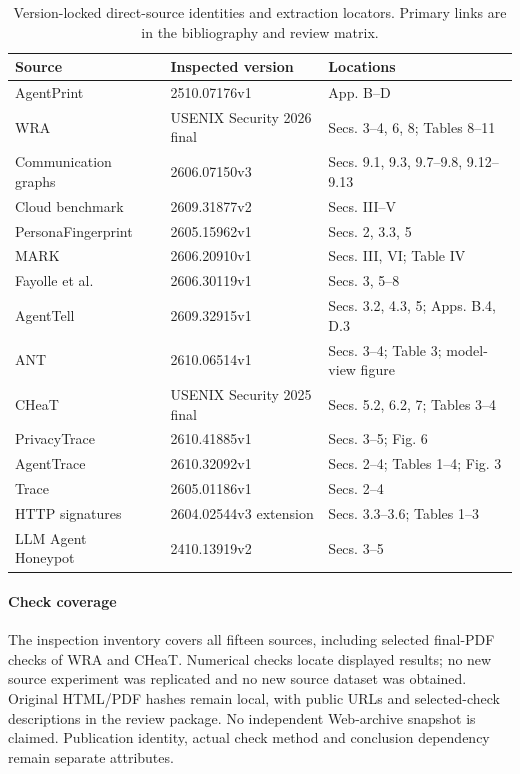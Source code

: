 \begin{table}[t]\centering\small
\caption{Version-locked direct-source identities and extraction locators. Primary links are in the bibliography and review matrix.}\label{tab:versions}
\begin{tabularx}{\textwidth}{@{}P{.29\textwidth}P{.32\textwidth}Y@{}}\toprule
Source & Inspected version & Locations \\\midrule
AgentPrint~\cite{agentprint2025} & 2510.07176v1 & App. B--D \\
WRA~\cite{jeong2026wra} & USENIX Security 2026 final & Secs. 3--4, 6, 8; Tables 8--11 \\
Communication graphs~\cite{dangol2026workflow} & 2606.07150v3 & Secs. 9.1, 9.3, 9.7--9.8, 9.12--9.13 \\
Cloud benchmark~\cite{pouryousef2026traffic} & 2609.31877v2 & Secs. III--V \\
PersonaFingerprint~\cite{song2026personafingerprint} & 2605.15962v1 & Secs. 2, 3.3, 5 \\
MARK~\cite{kang2026whoseagent} & 2606.20910v1 & Secs. III, VI; Table IV \\
Fayolle et al.~\cite{fayolle2026webagents} & 2606.30119v1 & Secs. 3, 5--8 \\
AgentTell~\cite{shahriar2026agenttell} & 2609.32915v1 & Secs. 3.2, 4.3, 5; Apps. B.4, D.3 \\
ANT~\cite{li2026ant} & 2610.06514v1 & Secs. 3--4; Table 3; model-view figure \\
CHeaT~\cite{ayzenshteyn2025cheat} & USENIX Security 2025 final & Secs. 5.2, 6.2, 7; Tables 3--4 \\
PrivacyTrace~\cite{duan2026privacytrace} & 2610.41885v1 & Secs. 3--5; Fig. 6 \\
AgentTrace~\cite{zhao2026agenttrace} & 2610.32092v1 & Secs. 2--4; Tables 1--4; Fig. 3 \\
Trace~\cite{ediga2026trace} & 2605.01186v1 & Secs. 2--4 \\
HTTP signatures~\cite{borysenko2026http} & 2604.02544v3 extension & Secs. 3.3--3.6; Tables 1--3 \\
LLM Agent Honeypot~\cite{reworr2024honeypot} & 2410.13919v2 & Secs. 3--5 \\
\bottomrule\end{tabularx}\end{table}

\paragraph{Check coverage} The inspection inventory covers all fifteen sources, including selected final-PDF checks of WRA and CHeaT. Numerical checks locate displayed results; no new source experiment was replicated and no new source dataset was obtained. Original HTML/PDF hashes remain local, with public URLs and selected-check descriptions in the review package. No independent Web-archive snapshot is claimed. Publication identity, actual check method and conclusion dependency remain separate attributes.

